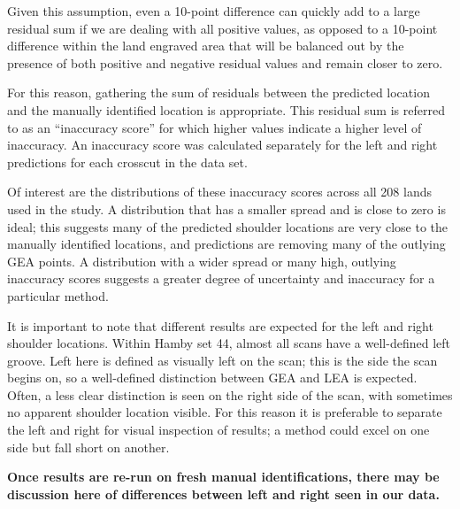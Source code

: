 \documentclass[12pt]{article}
\begin{document}
Given this assumption, even a 10-point difference can quickly add to a
large residual sum if we are dealing with all positive values, as
opposed to a 10-point difference within the land engraved area that will
be balanced out by the presence of both positive and negative residual
values and remain closer to zero.

For this reason, gathering the sum of residuals between the predicted
location and the manually identified location is appropriate. This
residual sum is referred to as an ``inaccuracy score'' for which higher
values indicate a higher level of inaccuracy. An inaccuracy score was
calculated separately for the left and right predictions for each
crosscut in the data set.

Of interest are the distributions of these inaccuracy scores across all
208 lands used in the study. A distribution that has a smaller spread
and is close to zero is ideal; this suggests many of the predicted
shoulder locations are very close to the manually identified locations,
and predictions are removing many of the outlying GEA points. A
distribution with a wider spread or many high, outlying inaccuracy
scores suggests a greater degree of uncertainty and inaccuracy for a
particular method.

It is important to note that different results are expected for the left
and right shoulder locations. Within Hamby set 44, almost all scans have
a well-defined left groove. Left here is defined as visually left on the
scan; this is the side the scan begins on, so a well-defined distinction
between GEA and LEA is expected. Often, a less clear distinction is seen
on the right side of the scan, with sometimes no apparent shoulder
location visible. For this reason it is preferable to separate the left
and right for visual inspection of results; a method could excel on one
side but fall short on another.

\textbf{Once results are re-run on fresh manual identifications, there
may be discussion here of differences between left and right seen in our
data.}
\end{document}
